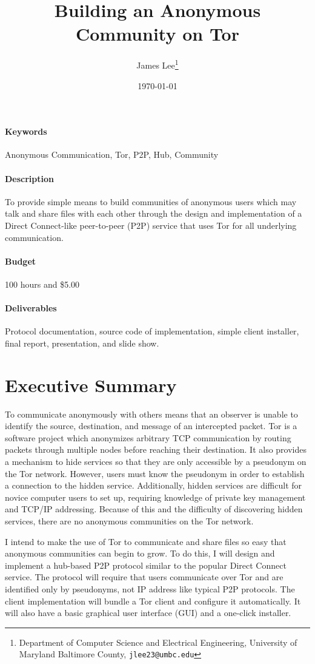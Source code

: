 \documentclass{article}
\title{Building an Anonymous Community on Tor}
\author{James Lee\thanks{
	Department of Computer Science and Electrical Engineering,
	University of Maryland Baltimore County,
	{\tt jlee23@umbc.edu}}}
\date{\today}
\begin{document}
\maketitle

\paragraph{Keywords} Anonymous Communication, Tor, P2P, Hub, Community

\paragraph{Description} To provide simple means to build communities of anonymous users which may talk and share files with each other through the design and implementation of a Direct Connect-like peer-to-peer (P2P) service that uses Tor for all underlying communication.

\paragraph{Budget} 100 hours and \$5.00

\paragraph{Deliverables} Protocol documentation, source code of implementation, simple client installer, final report, presentation, and slide show.

\section{Executive Summary}
To communicate anonymously with others means that an observer is unable to identify the source, destination, and message of an intercepted packet.  Tor is a software project which anonymizes arbitrary TCP communication by routing packets through multiple nodes before reaching their destination.  It also provides a mechanism to hide services so that they are only accessible by a pseudonym on the Tor network.  However, users must know the pseudonym in order to establish a connection to the hidden service.  Additionally, hidden services are difficult for novice computer users to set up, requiring knowledge of private key management and TCP/IP addressing.  Because of this and the difficulty of discovering hidden services, there are no anonymous communities on the Tor network.

I intend to make the use of Tor to communicate and share files so easy that anonymous communities can begin to grow.  To do this, I will design and implement a hub-based P2P protocol similar to the popular Direct Connect service.  The protocol will require that users communicate over Tor and are identified only by pseudonyms, not IP address like typical P2P protocols.  The client implementation will bundle a Tor client and configure it automatically.  It will also have a basic graphical user interface (GUI) and a one-click installer.
\end{document}
